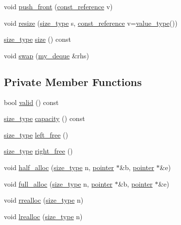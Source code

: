 \begin{DoxyCompactItemize}
\item 
void \hyperlink{classmy__deque_af8d66a7ed1fd51476ec785228ac76996}{push\-\_\-front} (\hyperlink{classmy__deque_ad50d8b378580088cf77fa43f0640e49c}{const\-\_\-reference} v)
\item 
void \hyperlink{classmy__deque_a80369f549dcd0a2ea9bc086fc97c8e25}{resize} (\hyperlink{classmy__deque_a61e5e5317fe72a381ce4d45f09544b02}{size\-\_\-type} s, \hyperlink{classmy__deque_ad50d8b378580088cf77fa43f0640e49c}{const\-\_\-reference} v=\hyperlink{classmy__deque_ae9c156c405acc57623a4601ce755596f}{value\-\_\-type}())
\item 
\hyperlink{classmy__deque_a61e5e5317fe72a381ce4d45f09544b02}{size\-\_\-type} \hyperlink{classmy__deque_a3100498f22d2dfa480b141f8ef7990ca}{size} () const 
\item 
void \hyperlink{classmy__deque_a22e1c253ac010e4327c87293b6cfbe5c}{swap} (\hyperlink{classmy__deque}{my\-\_\-deque} \&rhs)
\end{DoxyCompactItemize}
\subsection*{Private Member Functions}
\begin{DoxyCompactItemize}
\item 
bool \hyperlink{classmy__deque_ac48856ffa58fe0d4d21852c503d7ff73}{valid} () const 
\item 
\hyperlink{classmy__deque_a61e5e5317fe72a381ce4d45f09544b02}{size\-\_\-type} \hyperlink{classmy__deque_a6402ba96543ef0e121dc72e4429b048f}{capacity} () const 
\item 
\hyperlink{classmy__deque_a61e5e5317fe72a381ce4d45f09544b02}{size\-\_\-type} \hyperlink{classmy__deque_ad27558d4bdbc6d40090690c73964b4dd}{left\-\_\-free} ()
\item 
\hyperlink{classmy__deque_a61e5e5317fe72a381ce4d45f09544b02}{size\-\_\-type} \hyperlink{classmy__deque_a9e192c63c5310c9c07e284c4804d460d}{right\-\_\-free} ()
\item 
void \hyperlink{classmy__deque_a358e9722c0c64546b0deda42cf96d68e}{half\-\_\-alloc} (\hyperlink{classmy__deque_a61e5e5317fe72a381ce4d45f09544b02}{size\-\_\-type} n, \hyperlink{classmy__deque_a58e82fc365a3b086367479515e1515be}{pointer} $\ast$\&b, \hyperlink{classmy__deque_a58e82fc365a3b086367479515e1515be}{pointer} $\ast$\&e)
\item 
void \hyperlink{classmy__deque_af62c0f9a57b864989b740c2bb0038a4e}{full\-\_\-alloc} (\hyperlink{classmy__deque_a61e5e5317fe72a381ce4d45f09544b02}{size\-\_\-type} n, \hyperlink{classmy__deque_a58e82fc365a3b086367479515e1515be}{pointer} $\ast$\&b, \hyperlink{classmy__deque_a58e82fc365a3b086367479515e1515be}{pointer} $\ast$\&e)
\item 
void \hyperlink{classmy__deque_a5189cfd5e74d44f7a5c843204c1852a7}{rrealloc} (\hyperlink{classmy__deque_a61e5e5317fe72a381ce4d45f09544b02}{size\-\_\-type} n)
\item 
void \hyperlink{classmy__deque_a27d5579c72c0045aee1ae78146f5b75a}{lrealloc} (\hyperlink{classmy__deque_a61e5e5317fe72a381ce4d45f09544b02}{size\-\_\-type} n)
\end{DoxyCompactItemize}
